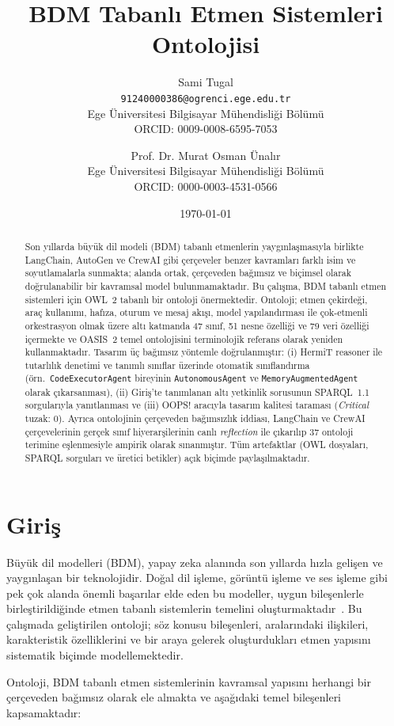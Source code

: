 \documentclass[10pt, a4paper, twocolumn]{article}
\title{%
  \textbf{BDM Tabanlı Etmen Sistemleri Ontolojisi}
}
\author{
  Sami Tugal\\
  \texttt{91240000386@ogrenci.ege.edu.tr}\\
  Ege Üniversitesi Bilgisayar Mühendisliği Bölümü\\
  ORCID: 0009-0008-6595-7053
  \and
  Prof. Dr. Murat Osman Ünalır\\
  Ege Üniversitesi Bilgisayar Mühendisliği Bölümü\\
  ORCID: 0000-0003-4531-0566
}
\date{\today}
\begin{document}
\maketitle

\begin{abstract}
    Son yıllarda büyük dil modeli (BDM) tabanlı etmenlerin yaygınlaşmasıyla birlikte LangChain, AutoGen ve CrewAI gibi çerçeveler benzer kavramları farklı isim ve soyutlamalarla sunmakta; alanda ortak, çerçeveden bağımsız ve biçimsel olarak doğrulanabilir bir kavramsal model bulunmamaktadır. Bu çalışma, BDM tabanlı etmen sistemleri için OWL~2 tabanlı bir ontoloji önermektedir. Ontoloji; etmen çekirdeği, araç kullanımı, hafıza, oturum ve mesaj akışı, model yapılandırması ile çok-etmenli orkestrasyon olmak üzere altı katmanda 47 sınıf, 51 nesne özelliği ve 79 veri özelliği içermekte ve OASIS~2 temel ontolojisini terminolojik referans olarak yeniden kullanmaktadır. Tasarım üç bağımsız yöntemle doğrulanmıştır: (i) HermiT reasoner ile tutarlılık denetimi ve tanımlı sınıflar üzerinde otomatik sınıflandırma (örn.\ \texttt{CodeExecutorAgent} bireyinin \texttt{AutonomousAgent} ve \texttt{MemoryAugmentedAgent} olarak çıkarsanması), (ii) Giriş'te tanımlanan altı yetkinlik sorusunun SPARQL~1.1 sorgularıyla yanıtlanması ve (iii) OOPS! aracıyla tasarım kalitesi taraması (\textit{Critical} tuzak: 0). Ayrıca ontolojinin çerçeveden bağımsızlık iddiası, LangChain ve CrewAI çerçevelerinin gerçek sınıf hiyerarşilerinin canlı \emph{reflection} ile çıkarılıp 37 ontoloji terimine eşlenmesiyle ampirik olarak sınanmıştır. Tüm artefaktlar (OWL dosyaları, SPARQL sorguları ve üretici betikler) açık biçimde paylaşılmaktadır.
\end{abstract}

\section{Giriş}

Büyük dil modelleri (BDM), yapay zeka alanında son yıllarda hızla gelişen ve yaygınlaşan bir teknolojidir. Doğal dil işleme, görüntü işleme ve ses işleme gibi pek çok alanda önemli başarılar elde eden bu modeller, uygun bileşenlerle birleştirildiğinde etmen tabanlı sistemlerin temelini oluşturmaktadır~\cite{xi2025rise}. Bu çalışmada geliştirilen ontoloji; söz konusu bileşenleri, aralarındaki ilişkileri, karakteristik özelliklerini ve bir araya gelerek oluşturdukları etmen yapısını sistematik biçimde modellemektedir.

Ontoloji, BDM tabanlı etmen sistemlerinin kavramsal yapısını herhangi bir çerçeveden bağımsız olarak ele almakta ve aşağıdaki temel bileşenleri kapsamaktadır:
\end{document}

